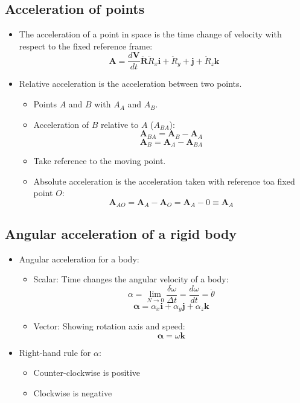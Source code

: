 \documentclass[11pt]{article}
\begin{document}
\subsection{Acceleration of points}
\label{sec:org3048385}
\begin{itemize}
\item The acceleration of a point in space is the time change of velocity with respect to the fixed reference frame:
\[\boldsymbol{A} = \frac{d \boldsymbol{V}}{dt} \ddot{\boldsymbol{R}} \ddot{R}_x \boldsymbol{i} + \ddot{R}_y + \boldsymbol{j} + \ddot{R}_z \boldsymbol{k}\]
\item Relative acceleration is the acceleration between two points.
\begin{itemize}
\item Points \(A\) and \(B\) with \(A_A\) and \(A_B\).
\item Acceleration of \(B\) relative to \(A\) (\(A_{BA}\)):
\[\boldsymbol{A}_{BA} = \boldsymbol{A}_B - \boldsymbol{A}_A\]
\[\boldsymbol{A}_{B} = \boldsymbol{A}_A - \boldsymbol{A}_{BA}\]
\item Take reference to the moving point.
\item Absolute acceleration is the acceleration taken with reference toa  fixed point \(O\):
\[\boldsymbol{A}_{AO} = \boldsymbol{A}_A - \boldsymbol{A}_O = \boldsymbol{A}_A - 0 \equiv \boldsymbol{A}_A\]
\end{itemize}
\end{itemize}
\subsection{Angular acceleration of a rigid body}
\label{sec:org950f7aa}
\begin{itemize}
\item Angular acceleration for a body:
\begin{itemize}
\item Scalar: Time changes the angular velocity of a body:
\[\alpha = \lim_{N \rightarrow 0} \frac{\delta \omega}{\Delta t} = \frac{d \omega}{dt} = \ddot{\theta}\]
\[\boldsymbol{\alpha} = \alpha_x \boldsymbol{i} + \alpha_y \boldsymbol{j} + \alpha_z \boldsymbol{k}\]
\item Vector: Showing rotation axis and speed:
\[\boldsymbol{\alpha} = \omega \boldsymbol{k}\]
\end{itemize}
\item Right-hand rule for \(\alpha\):
\begin{itemize}
\item Counter-clockwise is positive
\item Clockwise is negative
\end{itemize}
\end{itemize}
\end{document}
